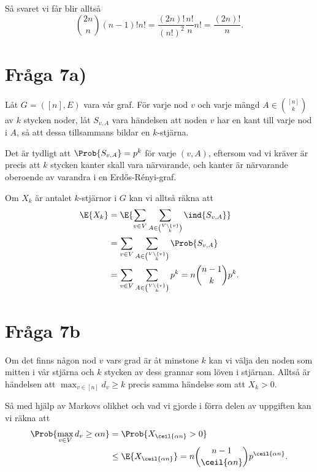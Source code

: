 \documentclass[nobib]{tufte-handout}
\begin{document}
Så svaret vi får blir alltså
$$\binom{2n}{n}(n-1)!n! = \frac{(2n)!}{(n!)^2}\frac{n!}{n}n! = \frac{(2n)!}{n}.$$

\section{Fråga 7a)}

Låt $G = ([n], E)$ vara vår graf. För varje nod $v$ och varje mängd $A \in \binom{[n]}{k}$ av $k$ stycken noder, låt $S_{v, A}$ vara händelsen att noden $v$ har en kant till varje nod i $A$, så att dessa tillsammans bildar en $k$-stjärna.

Det är tydligt att $\Prob{S_{v,A}} = p^k$ för varje $(v, A)$, eftersom vad vi kräver är precis att $k$ stycken kanter skall vara närvarande, och kanter är närvarande oberoende av varandra i en Erd\H{o}s-Rényi-graf.

Om $X_k$ är antalet $k$-stjärnor i $G$ kan vi alltså räkna att
\begin{align*}
    \E{X_k} &= \E{\sum_{v \in V}\sum_{A \in \binom{V\setminus \{v\}}{k}} \ind{S_{v,A}}}\\
    &= \sum_{v \in V}\sum_{A \in \binom{V\setminus \{v\}}{k}} \Prob{S_{v,A}}\\
    &= \sum_{v \in V}\sum_{A \in \binom{V\setminus \{v\}}{k}} p^k = n\binom{n-1}{k}p^k.
\end{align*}

\section{Fråga 7b}

Om det finns någon nod $v$ vars grad är åt minstone $k$ kan vi välja den noden som mitten i vår stjärna och $k$ stycken av dess grannar som löven i stjärnan. Alltså är händelsen att $\max_{v \in [n]} d_v \geq k$ precis samma händelse som att $X_k > 0$.

Så med hjälp av Markovs olikhet och vad vi gjorde i förra delen av uppgiften kan vi räkna att
\begin{align*}
    \Prob{\max_{v \in V} d_v \geq \alpha n} &= \Prob{X_{\ceil{\alpha n}} > 0}\\
    &\leq \E{X_{\ceil{\alpha n}}} = n\binom{n-1}{\ceil{\alpha n}}p^{\ceil{\alpha n}}.
\end{align*}
\end{document}
